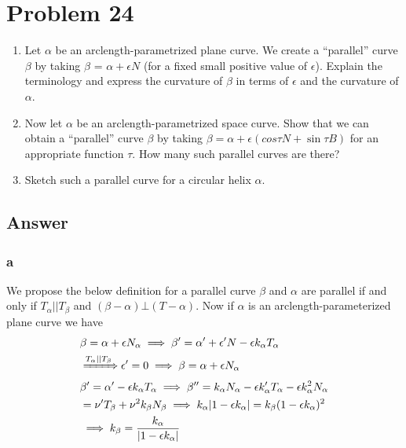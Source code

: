 \documentclass[
	12pt, %
]{fphw}
\theoremstyle{plain}
\begin{document}
\section*{Problem 24}
\begin{problem}
     \begin{enumerate}
          \item Let $\alpha$ be an arclength-parametrized plane curve. We create a “parallel” curve $\beta$ by taking $\beta$ =
          $\alpha + \epsilon N$ (for a fixed small positive value of $\epsilon$). Explain the terminology and express the curvature
          of $\beta$ in terms of $\epsilon$ and the curvature of $\alpha$.
          \item Now let $\alpha$ be an arclength-parametrized space curve. Show that we can obtain a “parallel” curve $\beta$
          by taking $\beta = \alpha + \epsilon(cos\tau N+ \sin\tau B)$
          for an appropriate function $\tau$. How many such parallel
          curves are there?
          \item Sketch such a parallel curve for a circular helix $\alpha$.
     \end{enumerate}
\end{problem}
\subsection*{Answer}

\subsubsection*{a}
We propose the below definition for a parallel curve $\beta$ and $\alpha$ are parallel if and only if $T_\alpha||T_\beta$ and $(\beta-\alpha) \bot (T-\alpha)$.
Now if $\alpha$ is an arclength-parameterized plane curve we have
\begin{align*}
&\beta=\alpha+\epsilon N_\alpha \implies \beta'=\alpha'+\epsilon'N-\epsilon k_\alpha T_\alpha\\
&\xRightarrow{T_\alpha||T_\beta} \epsilon'=0 \implies \beta = \alpha+\epsilon N_\alpha\\
&\beta'=\alpha'-\epsilon k_\alpha T_\alpha \implies \beta''=k_\alpha N_\alpha-\epsilon k'_\alpha T_\alpha - \epsilon k_{\alpha}^2 N_\alpha\\ 
&=\nu' T_\beta + \nu^2 k_\beta N_\beta \implies k_\alpha|1-\epsilon k_\alpha|=k_\beta(1-\epsilon k_\alpha)^2\\
&\implies k_\beta = \frac{k_\alpha}{|1-\epsilon k_\alpha|}
\end{align*}
\end{document}
